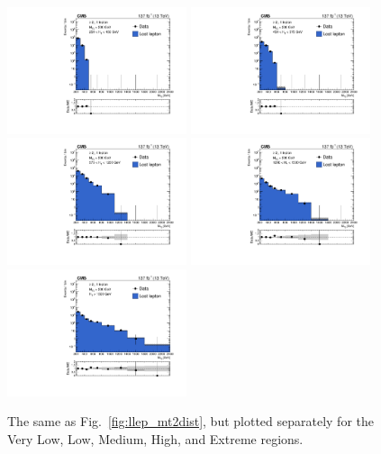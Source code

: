 \begin{figure}[htbp]
  \begin{center}
    \includegraphics[width=0.47\textwidth]{figs/llep/lostlepHybrid_incl_HT250to450_mt2bins.pdf}
    \includegraphics[width=0.47\textwidth]{figs/llep/lostlepHybrid_incl_HT450to575_mt2bins.pdf} \\
    \includegraphics[width=0.47\textwidth]{figs/llep/lostlepHybrid_incl_HT575to1200_mt2bins.pdf}
    \includegraphics[width=0.47\textwidth]{figs/llep/lostlepHybrid_incl_HT1200to1500_mt2bins.pdf} \\
    \includegraphics[width=0.47\textwidth]{figs/llep/lostlepHybrid_incl_HTge1500_mt2bins.pdf}
    \caption{The same as Fig.~\ref{fig:llep_mt2dist}, but plotted separately for the Very Low,
      Low, Medium, High, and Extreme \Ht regions.
            }
    \label{fig:llep_mt2dist_ht}
  \end{center}
\end{figure}

